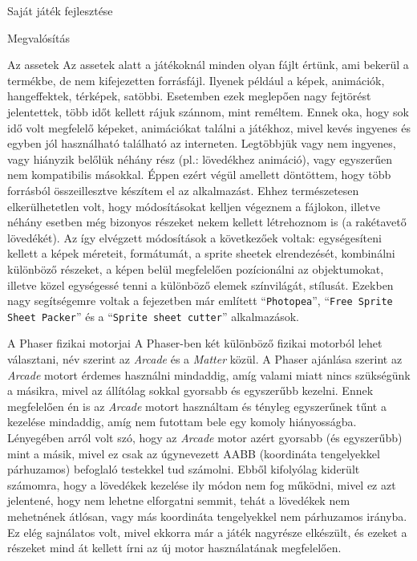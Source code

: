 \begin{MyChapter}{Saját játék fejlesztése}
\begin{MySection}{Megvalósítás}
		\begin{MySubSection}{Az assetek}
			Az assetek alatt a játékoknál minden olyan fájlt értünk, ami bekerül a termékbe, de nem kifejezetten forrásfájl. Ilyenek például a képek, animációk, hangeffektek, térképek, satöbbi. \cite{game_development_terms} Esetemben ezek meglepően nagy fejtörést jelentettek, több időt kellett rájuk szánnom, mint reméltem. Ennek oka, hogy sok idő volt megfelelő képeket, animációkat találni a játékhoz, mivel kevés ingyenes és egyben jól használható található az interneten. Legtöbbjük vagy nem ingyenes, vagy hiányzik belőlük néhány rész (pl.: lövedékhez animáció), vagy egyszerűen nem kompatibilis másokkal. Éppen ezért végül amellett döntöttem, hogy több forrásból összeillesztve készítem el az alkalmazást. Ehhez természetesen elkerülhetetlen volt, hogy módosításokat kelljen végeznem a fájlokon, illetve néhány esetben még bizonyos részeket nekem kellett létrehoznom is (a rakétavető lövedékét). Az így elvégzett módosítások a következőek voltak: egységesíteni kellett a képek méreteit, formátumát, a sprite sheetek elrendezését, kombinálni különböző részeket, a képen belül megfelelően pozícionálni az objektumokat, illetve közel egységessé tenni a különböző elemek színvilágát, stílusát. Ezekben nagy segítségemre voltak a  fejezetben már említett ``\texttt{Photopea}'', ``\texttt{Free Sprite Sheet Packer}'' és a ``\texttt{Sprite sheet cutter}'' alkalmazások.
		\end{MySubSection}
		
		\begin{MySubSection}{A Phaser fizikai motorjai}
			A Phaser-ben két különböző fizikai motorból lehet választani, név szerint az \textit{Arcade} és a \textit{Matter} közül. A Phaser ajánlása szerint az \textit{Arcade} motort érdemes használni mindaddig, amíg valami miatt nincs szükségünk a másikra, mivel az állítólag sokkal gyorsabb és egyszerűbb kezelni. Ennek megfelelően én is az \textit{Arcade} motort használtam és tényleg egyszerűnek tűnt a kezelése mindaddig, amíg nem futottam bele egy komoly hiányosságba. Lényegében arról volt szó, hogy az \textit{Arcade} motor azért gyorsabb (és egyszerűbb) mint a másik, mivel ez csak az úgynevezett AABB (koordináta tengelyekkel párhuzamos) befoglaló testekkel tud számolni. Ebből kifolyólag kiderült számomra, hogy a lövedékek kezelése ily módon nem fog működni, mivel ez azt jelentené, hogy nem lehetne elforgatni semmit, tehát a lövedékek nem mehetnének átlósan, vagy más koordináta tengelyekkel nem párhuzamos irányba. Ez elég sajnálatos volt, mivel ekkorra már a játék nagyrésze elkészült, és ezeket a részeket mind át kellett írni az új motor használatának megfelelően.
			

\end{MySubSection}
\end{MySection}
\end{MyChapter}
